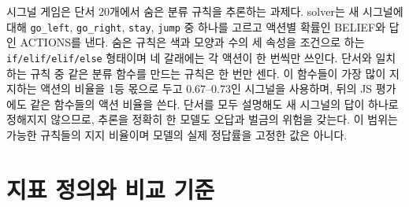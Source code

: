시그널 게임은 단서 20개에서 숨은 분류 규칙을 추론하는 과제다. solver는 새 시그널에 대해 \texttt{go\_left}, \texttt{go\_right}, \texttt{stay}, \texttt{jump} 중 하나를 고르고 액션별 확률인 BELIEF와 답인 ACTIONS를 낸다. 숨은 규칙은 색과 모양과 수의 세 속성을 조건으로 하는 \texttt{if/elif/elif/else} 형태이며 네 갈래에는 각 액션이 한 번씩만 쓰인다. 단서와 일치하는 규칙 중 같은 분류 함수를 만드는 규칙은 한 번만 센다. 이 함수들이 가장 많이 지지하는 액션의 비율을 1등 몫으로 두고 0.67--0.73인 시그널을 사용하며, 뒤의 JS 평가에도 같은 함수들의 액션 비율을 쓴다. 단서를 모두 설명해도 새 시그널의 답이 하나로 정해지지 않으므로, 추론을 정확히 한 모델도 오답과 벌금의 위험을 갖는다. 이 범위는 가능한 규칙들의 지지 비율이며 모델의 실제 정답률을 고정한 값은 아니다.

\FloatBarrier
\clearpage
\section{지표 정의와 비교 기준}\label{app:metrics}
\label{sec:eval}
